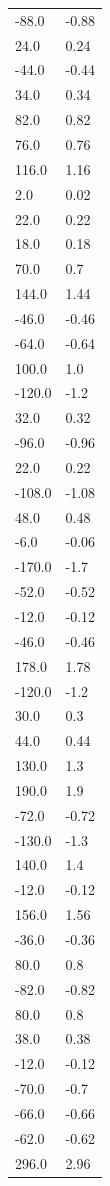 \begin{longtable}{ll}
-88.0 & -0.88 \\
24.0 & 0.24 \\
-44.0 & -0.44 \\
34.0 & 0.34 \\
82.0 & 0.82 \\
76.0 & 0.76 \\
116.0 & 1.16 \\
2.0 & 0.02 \\
22.0 & 0.22 \\
18.0 & 0.18 \\
70.0 & 0.7 \\
144.0 & 1.44 \\
-46.0 & -0.46 \\
-64.0 & -0.64 \\
100.0 & 1.0 \\
-120.0 & -1.2 \\
32.0 & 0.32 \\
-96.0 & -0.96 \\
22.0 & 0.22 \\
-108.0 & -1.08 \\
48.0 & 0.48 \\
-6.0 & -0.06 \\
-170.0 & -1.7 \\
-52.0 & -0.52 \\
-12.0 & -0.12 \\
-46.0 & -0.46 \\
178.0 & 1.78 \\
-120.0 & -1.2 \\
30.0 & 0.3 \\
44.0 & 0.44 \\
130.0 & 1.3 \\
190.0 & 1.9 \\
-72.0 & -0.72 \\
-130.0 & -1.3 \\
140.0 & 1.4 \\
-12.0 & -0.12 \\
156.0 & 1.56 \\
-36.0 & -0.36 \\
80.0 & 0.8 \\
-82.0 & -0.82 \\
80.0 & 0.8 \\
38.0 & 0.38 \\
-12.0 & -0.12 \\
-70.0 & -0.7 \\
-66.0 & -0.66 \\
-62.0 & -0.62 \\
296.0 & 2.96 \\

\end{longtable}
